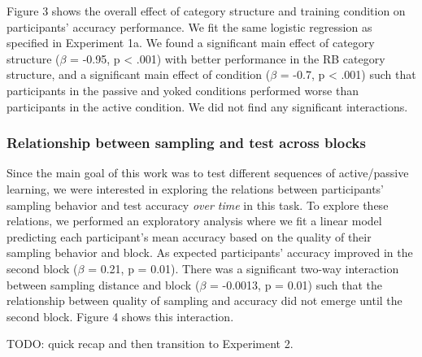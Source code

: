 \documentclass[10pt, letterpaper]{article}
\begin{document}
Figure 3 shows the overall effect of category structure and training
condition on participants' accuracy performance. We fit the same
logistic regression as specified in Experiment 1a. We found a
significant main effect of category structure (\(\beta\) = -0.95, p
\textless{} .001) with better performance in the RB category structure,
and a significant main effect of condition (\(\beta\) = -0.7, p
\textless{} .001) such that participants in the passive and yoked
conditions performed worse than participants in the active condition. We
did not find any significant interactions.

\subsubsection{Relationship between sampling and test across
blocks}\label{relationship-between-sampling-and-test-across-blocks}

Since the main goal of this work was to test different sequences of
active/passive learning, we were interested in exploring the relations
between participants' sampling behavior and test accuracy \emph{over
time} in this task. To explore these relations, we performed an
exploratory analysis where we fit a linear model predicting each
participant's mean accuracy based on the quality of their sampling
behavior and block. As expected participants' accuracy improved in the
second block (\(\beta\) = 0.21, p = 0.01). There was a significant
two-way interaction between sampling distance and block (\(\beta\) =
-0.0013, p = 0.01) such that the relationship between quality of
sampling and accuracy did not emerge until the second block. Figure 4
shows this interaction.

TODO: quick recap and then transition to Experiment 2.
\end{document}
